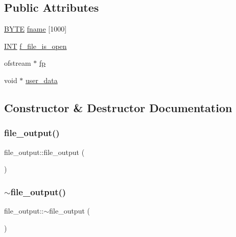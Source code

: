 \subsection*{Public Attributes}
\begin{DoxyCompactItemize}
\item 
\mbox{\hyperlink{galois_8h_ab6cc7b4aeb6ea31aba2b3fbfc83ff5e6}{B\+Y\+TE}} \mbox{\hyperlink{classfile__output_acc70b107edd9ffbf93008d2de83274e5}{fname}} \mbox{[}1000\mbox{]}
\item 
\mbox{\hyperlink{galois_8h_a09fddde158a3a20bd2dcadb609de11dc}{I\+NT}} \mbox{\hyperlink{classfile__output_a98ca4a76d2d3465d3a9136a70d2ee9fb}{f\+\_\+file\+\_\+is\+\_\+open}}
\item 
ofstream $\ast$ \mbox{\hyperlink{classfile__output_ae7ae207b209d10300f3bd748c40dcd42}{fp}}
\item 
void $\ast$ \mbox{\hyperlink{classfile__output_a7337cf9663a3cecb88dd03229a6356a6}{user\+\_\+data}}
\end{DoxyCompactItemize}


\subsection{Constructor \& Destructor Documentation}
\mbox{\label{classfile__output_ad861cad91b36cfb40938d33f1e24a0e7}} 
\subsubsection{\texorpdfstring{file\+\_\+output()}{file\_output()}}
{\footnotesize\ttfamily file\+\_\+output\+::file\+\_\+output (\begin{DoxyParamCaption}{ }\end{DoxyParamCaption})}

\mbox{\label{classfile__output_ad95864cb7ef7ca6e6ee6a4b17c9f2adb}} 
\subsubsection{\texorpdfstring{$\sim$file\+\_\+output()}{~file\_output()}}
{\footnotesize\ttfamily file\+\_\+output\+::$\sim$file\+\_\+output (\begin{DoxyParamCaption}{ }\end{DoxyParamCaption})}



